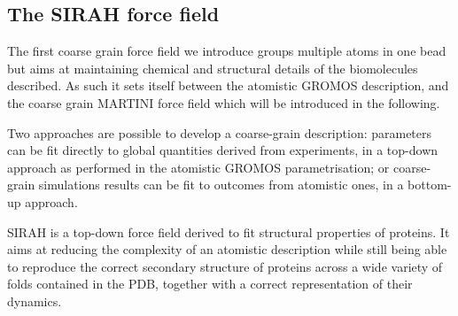 \subsection{The SIRAH force field}

The first coarse grain force field we introduce groups multiple atoms in one bead but aims at maintaining chemical and structural details of the biomolecules described. As such it sets itself between the atomistic GROMOS description, and the coarse grain MARTINI force field \citep{Marrink2007,Monticelli2008,DeJong2013} which will be introduced in the following.

Two approaches are possible to develop a coarse-grain description: parameters can be fit directly to global quantities derived from experiments, in a top-down approach as performed in the atomistic GROMOS parametrisation; or coarse-grain simulations results can be fit to outcomes from atomistic ones, in a bottom-up approach.

SIRAH \citep{Machado2018,Barrera2019} is a top-down force field derived to fit structural properties of proteins. It aims at reducing the complexity of an atomistic description while still being able to reproduce the correct secondary structure of proteins across a wide variety of folds contained in the PDB, together with a correct representation of their dynamics.

